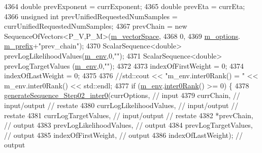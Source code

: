 \begin{DoxyCode}
{{4364     \textcolor{keywordtype}{double}       prevExponent                   = currExponent;
4365     \textcolor{keywordtype}{double}       prevEta                        = currEta;
4366     \textcolor{keywordtype}{unsigned} \textcolor{keywordtype}{int} prevUnifiedRequestedNumSamples = currUnifiedRequestedNumSamples;
4367     prevChain = \textcolor{keyword}{new} SequenceOfVectors<P\_V,P\_M>(\hyperlink{class_q_u_e_s_o_1_1_m_l_sampling_a7bc4c72f65ba9166ed94a6e198b0915b}{m\_vectorSpace},
4368                                                       0,
4369                                                       \hyperlink{class_q_u_e_s_o_1_1_m_l_sampling_af8504cc57ec72b3c52833826b2bfff8e}{m\_options}.
      \hyperlink{class_q_u_e_s_o_1_1_m_l_sampling_options_a1d3d48598e0b59b46337ce66a52671a5}{m\_prefix}+\textcolor{stringliteral}{"prev\_chain"});
4370     ScalarSequence<double> prevLogLikelihoodValues(\hyperlink{class_q_u_e_s_o_1_1_m_l_sampling_a13f1ca4fe9f94822fe572a743eaced1d}{m\_env},0,\textcolor{stringliteral}{""});
4371     ScalarSequence<double> prevLogTargetValues    (\hyperlink{class_q_u_e_s_o_1_1_m_l_sampling_a13f1ca4fe9f94822fe572a743eaced1d}{m\_env},0,\textcolor{stringliteral}{""});
4372 
4373     indexOfFirstWeight = 0;
4374     indexOfLastWeight  = 0;
4375 
4376     \textcolor{comment}{//std::cout << "m\_env.inter0Rank() = " << m\_env.inter0Rank() << std::endl;}
4377     \textcolor{keywordflow}{if} (\hyperlink{class_q_u_e_s_o_1_1_m_l_sampling_a13f1ca4fe9f94822fe572a743eaced1d}{m\_env}.\hyperlink{class_q_u_e_s_o_1_1_base_environment_ae106b5bb8a80b655b88b3a26b1e7c185}{inter0Rank}() >= 0) \{
4378       \hyperlink{class_q_u_e_s_o_1_1_m_l_sampling_a06c37730b943a1838d58475d322639b9}{generateSequence\_Step02\_inter0}(currOptions,             \textcolor{comment}{// input}
4379                                      currChain,               \textcolor{comment}{// input/output // restate}
4380                                      currLogLikelihoodValues, \textcolor{comment}{// input/output // restate}
4381                                      currLogTargetValues,     \textcolor{comment}{// input/output // restate}
4382                                      *prevChain,              \textcolor{comment}{// output}
4383                                      prevLogLikelihoodValues, \textcolor{comment}{// output}
4384                                      prevLogTargetValues,     \textcolor{comment}{// output}
4385                                      indexOfFirstWeight,      \textcolor{comment}{// output}
4386                                      indexOfLastWeight);      \textcolor{comment}{// output}
}}
\end{DoxyCode}
